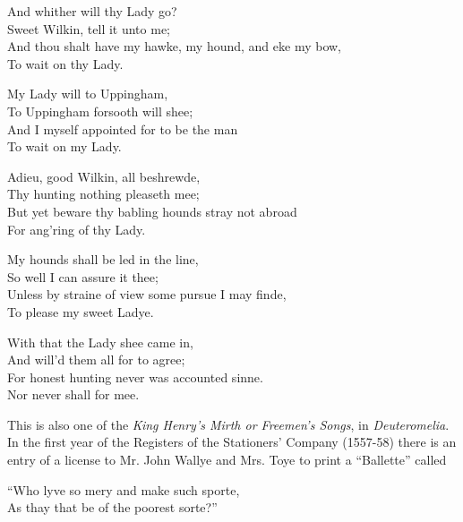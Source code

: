 \begin{scverse}
\begin{altverse}
And whither will thy Lady go?\\
Sweet Wilkin, tell it unto me;\\
And thou shalt have my hawke, my hound, and eke my bow,\\
To wait on thy Lady.
\end{altverse}

\begin{altverse}
My Lady will to Uppingham,\footnotemark\\
To Uppingham forsooth will shee;\\
And I myself appointed for to be the man\\
To wait on my Lady.
\end{altverse}

\begin{altverse}
Adieu, good Wilkin, all beshrewde,\\
Thy hunting nothing pleaseth mee;\\
But yet beware thy babling hounds stray not abroad\\
For ang’ring of thy Lady.
\end{altverse}

\begin{altverse}
My hounds shall be led in the line,\\
So well I can assure it thee;\\
Unless by straine of view some pursue I may finde,\\
To please my sweet Ladye.
\end{altverse}

\begin{altverse}
With that the Lady shee came in,\\
And will’d them all for to agree;\\
For honest hunting never was accounted sinne.\\
Nor never shall for mee.
\end{altverse}
\end{scverse}


\pagebreak


This is also one of the \textit{King Henry’s Mirth or Freemen’s Songs}, in \textit{Deuteromelia}.
In the first year of the Registers of the Stationers’ Company (1557-58)
there is an entry of a license to Mr. John Wallye and Mrs. Toye to print a
“Ballette” called
\begin{scverse}
“Who lyve so mery and make such sporte,\\
As thay that be of the poorest sorte?”
\end{scverse}

